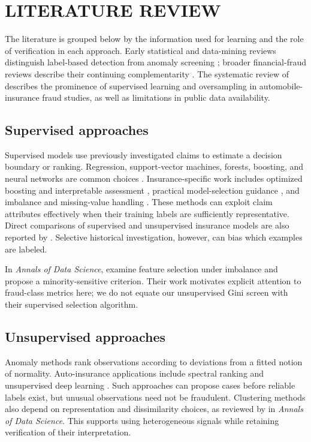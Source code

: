 \section{LITERATURE REVIEW}\label{SC:LR}\label{sec:literature}
\begin{revised}
The literature is grouped below by the information used for learning and
the role of verification in each approach.
Early statistical and data-mining reviews distinguish label-based detection
from anomaly screening \citep{Bolton2002,Ngai2011}; broader financial-fraud
reviews describe their continuing complementarity \citep{West2016,A61}.
The systematic review of \citet{Schrijver2024} describes the prominence of
supervised learning and oversampling in automobile-insurance fraud studies,
as well as limitations in public data availability.

\subsection{Supervised approaches}
Supervised models use previously investigated claims to estimate a decision
boundary or ranking. Regression, support-vector machines, forests, boosting,
and neural networks are common choices \citep{A80,A61}. Insurance-specific
work includes optimized boosting and interpretable assessment
\citep{Ding2025}, practical model-selection guidance
\citep{BanulescuRadu2024}, and imbalance and missing-value handling
\citep{Khalil2024}. These methods can exploit claim attributes effectively
when their training labels are sufficiently representative. Direct comparisons
of supervised and unsupervised insurance models are also reported by
\citet{Debener2023}. Selective
historical investigation, however, can bias which examples are labeled.

In \emph{Annals of Data Science}, \citet{Kamalov2023} examine feature selection
under imbalance and propose a minority-sensitive criterion. Their work
motivates explicit attention to fraud-class metrics here; we do not equate
our unsupervised Gini screen with their supervised selection algorithm.

\subsection{Unsupervised approaches}
Anomaly methods rank observations according to deviations from a fitted
notion of normality. Auto-insurance applications include spectral ranking
\citep{Nian2016} and unsupervised deep learning \citep{Gomes2021}.
Such approaches can propose cases before reliable labels exist, but unusual
observations need not be fraudulent. Clustering methods also depend on
representation and dissimilarity choices, as reviewed by
\citet{XuTian2015} in \emph{Annals of Data Science}. This supports using
heterogeneous signals while retaining verification of their interpretation.


\end{revised}
